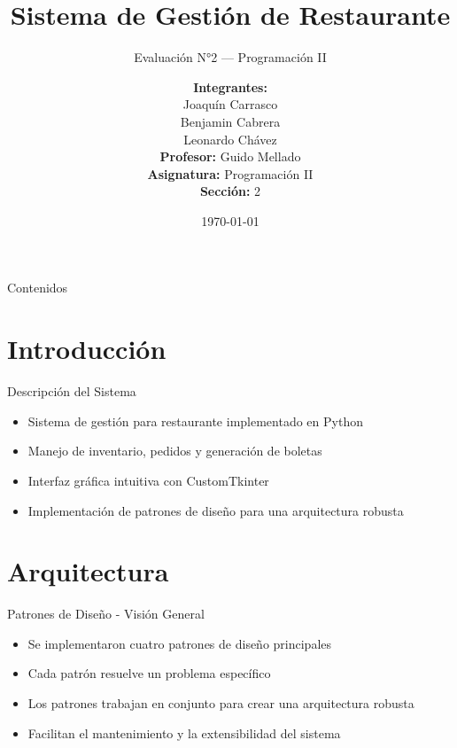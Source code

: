 \documentclass[12pt]{beamer}
\institute{Universidad Católica de Temuco\\
          Facultad de Ingeniería}
\author{%
    \textbf{Integrantes:}\\[0.3cm]
    Joaqu\'{i}n Carrasco\\[0.3cm]
    Benjamin Cabrera\\[0.3cm]
    Leonardo Ch\'{a}vez\\[0.3cm]
    \textbf{Profesor:} Guido Mellado\\[0.3cm]
    \textbf{Asignatura:} Programaci\'{o}n II\\[0.3cm]
    \textbf{Secci\'{o}n:} 2%
}
\title{Sistema de Gestión de Restaurante}
\subtitle{Evaluación N°2 --- Programación II}
\date{\today}
\begin{document}
\begin{frame}[plain]
    \titlepage{}
\end{frame}

\begin{frame}{Contenidos}
    \tableofcontents
\end{frame}

\section{Introducción}
\begin{frame}{Descripción del Sistema}
    \begin{itemize}
        \item Sistema de gestión para restaurante implementado en Python
        \item Manejo de inventario, pedidos y generación de boletas
        \item Interfaz gráfica intuitiva con CustomTkinter
        \item Implementación de patrones de diseño para una arquitectura robusta
    \end{itemize}
\end{frame}

\section{Arquitectura}
\begin{frame}{Patrones de Diseño - Visión General}
    \begin{itemize}
        \item Se implementaron cuatro patrones de diseño principales
        \item Cada patrón resuelve un problema específico
        \item Los patrones trabajan en conjunto para crear una arquitectura robusta
        \item Facilitan el mantenimiento y la extensibilidad del sistema
    \end{itemize}
\end{frame}
\end{document}
